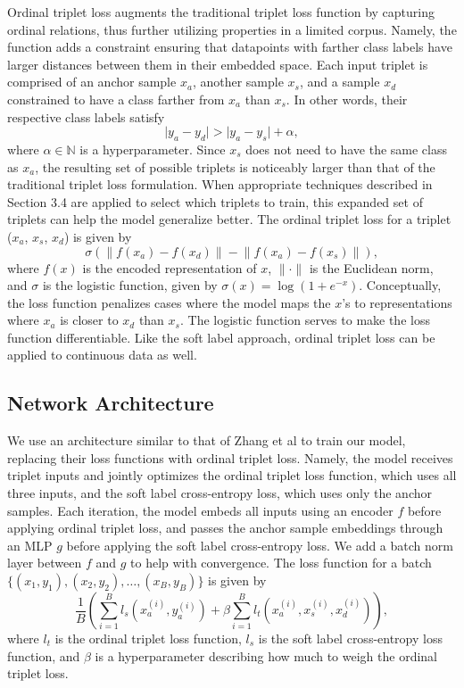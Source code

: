 Ordinal triplet loss augments the traditional triplet loss function \cite{schroff2015facenet}
by capturing ordinal relations, thus further utilizing properties in a limited corpus.
Namely, the function adds a constraint ensuring that datapoints with farther class labels have larger distances between them in their embedded space.
Each input triplet is comprised of an anchor sample $x_a$, another sample $x_s$, and a sample $x_d$ constrained to have a class farther from $x_a$ than $x_s$. In other words, their respective class labels satisfy $$\lvert y_a-y_d \rvert > \lvert y_a-y_s \rvert+\alpha,$$
where $\alpha \in \mathbb{N}$ is a hyperparameter.
Since $x_s$ does not need to have the same class as $x_a$, the resulting set of possible triplets is noticeably larger than that of the traditional triplet loss formulation. 
When appropriate techniques described in Section 3.4
are applied to select which triplets to train, this expanded set of triplets can help the model generalize better.
The ordinal triplet loss for a triplet ($x_a$, $x_s$, $x_d$) is given by
$$\sigma(\lVert f(x_a)-f(x_d) \rVert-\lVert f(x_a)-f(x_s) \rVert),$$
where $f(x)$ is the encoded representation of $x$, $\lVert \cdot \rVert$ is the Euclidean norm, and $\sigma$ is the logistic function, given by $\sigma(x) = \log(1 + e^{-x})$.
Conceptually, the loss function penalizes cases where the model maps the $x$'s to representations where $x_a$ is closer to $x_d$ than $x_s$. The logistic function serves to make the loss function differentiable. %
Like the soft label approach, ordinal triplet loss can be applied to continuous data as well.

\subsection{Network Architecture}

We use an architecture similar to that of Zhang et al \cite{zhang2019fsim}
to train our model, replacing their loss functions with ordinal triplet loss. 
Namely, the model receives triplet inputs and jointly optimizes the ordinal triplet loss function, which uses all three inputs, and the soft label cross-entropy loss, which uses only the anchor samples.
Each iteration, the model embeds all inputs using an encoder $f$ before applying ordinal triplet loss, and passes the anchor sample embeddings through an MLP $g$ before applying the soft label cross-entropy loss.
We add a batch norm layer between $f$ and $g$ to help with convergence.
The loss function for a batch $\{(x_1, y_1), (x_2, y_2), \dots, (x_B, y_B)\}$ is given by
$$\frac{1}{B}\left(\sum_{i=1}^B l_s(x_a^{(i)}, y_a^{(i)}) + \beta \sum_{i=1}^B l_t(x_a^{(i)}, x_s^{(i)}, x_d^{(i)}) \right),$$
where $l_t$ is the ordinal triplet loss function, $l_s$ is the soft label cross-entropy loss function, and $\beta$ is a hyperparameter describing how much to weigh the ordinal triplet loss.

